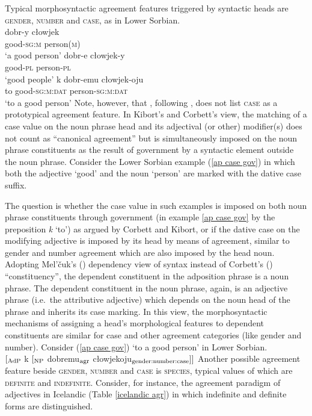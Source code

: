 Typical morphosyntactic agreement features triggered by syntactic heads are \textsc{gender, number} and \textsc{case}, as in Lower Sorbian.
\ea \label{sorbian agr}
\\
\ea
\gll	dobr-y cłowjek\\
	good-\textsc{sg:m} person(\textsc{m})\\
\glt	‘a good person’
\ex
\gll	dobr-e cłowjek-y\\
	good-\textsc{pl} person-\textsc{pl}\\
\glt	‘good people’
\ex \label{ap case gov}
\gll	k dobr-emu cłowjek-oju\\
	to good-\textsc{sg:m:dat} person-\textsc{sg:m:dat}\\
\glt	‘to a good person’
\z
\z 
Note, however, that \textcite{kibort2010a}, following \citealt[133–135]{corbett2006}, does not list \textsc{case} as a prototypical agreement feature. In Kibort's and Corbett's view, the matching of a case value on the noun phrase head and its adjectival (or other) modifier(s) does not count as “canonical agreement” but is simultaneously imposed on the noun phrase constituents as the result of government by a syntactic element outside the noun phrase. Consider the Lower Sorbian example (\ref{ap case gov}) in which both the adjective ‘good’ and the noun ‘person’ are marked with the dative case suffix.

The question is whether the case value in such examples is imposed on both noun phrase constituents through government (in example \ref{ap case gov} by the preposition \textit{k} ‘to’) as argued by Corbett and Kibort, or if the dative case on the modifying adjective is imposed by its head by means of agreement, similar to gender and number agreement which are also imposed by the head noun. Adopting Mel'čuk's (\citeyear[329, 337]{melcuk1993}) dependency view of syntax instead of Corbett's (\citeyear[133]{corbett2006}) “constituency”, the dependent constituent in the adposition phrase is a noun phrase. The dependent constituent in the noun phrase, again, is an adjective phrase (i.e.~the attributive adjective) which depends on the noun head of the phrase and inherits its case marking. In this view, the morphosyntactic mechanisms of assigning a head's morphological features to dependent constituents are similar for case and other agreement categories (like gender and number). Consider (\ref{ap case gov}) ‘to a good person’ in Lower Sorbian.
\ea
{}\\
$[_{\rm AdP}$ k $[_{\rm NP}$ dobremu$_{\rm agr}$ cłowjekoju$_{\rm gender:number:case} ] ]$
\z
Another possible agreement feature beside \textsc{gender, number} and \textsc{case} is \textsc{species}, typical values of which are \textsc{definite} and \textsc{indefinite}. Consider, for instance, the agreement paradigm of adjectives in Icelandic (Table \ref{icelandic agr}) in which indefinite and definite forms are distinguished.

